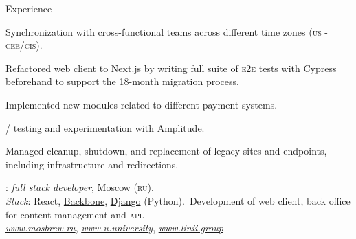 \documentclass[11pt,a4paper]{article}
\begin{document}
\begin{cv}
\begin{cvlist}{Experience}
    \begin{customlist}[topsep={-4pt},partopsep={0pt}, noitemsep]
      \item Synchronization with cross-functional teams across different time zones ({\textsc{us}} - {\textsc{cee/cis}}).
      \item Refactored web client to \href{https://nextjs.org/}{Next.js} by writing full suite of {\textsc{e}}2{\textsc{e}} tests with \href{https://www.cypress.io/}{Cypress} beforehand to support the 18-month migration process.
      \item Implemented new modules related to different payment systems.
      \item {}/{} testing and experimentation with \href{https://amplitude.com/}{Amplitude}.
      \item Managed cleanup, shutdown, and replacement of legacy sites and endpoints, including infrastructure and redirections.
    \end{customlist}

    \item[2017--2019] \href{https://astroshock.ru}{}: {\it{full stack developer}}, Moscow (\textsc{ru}).\\
    \textit{Stack}: React, \href{https://backbonejs.org/}{Backbone}, \href{https://www.djangoproject.com/}{Django} (Python).\ Development of web client, back office for content management and \textsc{api}.\\
    \href{https://mosbrew.ru}{\textit{www.mosbrew.ru}}, \href{https://u.university/}{\textit{www.u.university}}, \href{https://linii.group}{\textit{www.linii.group}}


\end{cvlist}
\end{cv}
\end{document}
